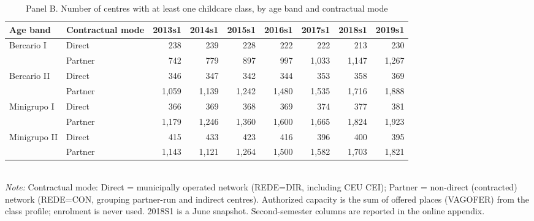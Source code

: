 \begin{table}[htbp]\centering
\caption{Panel B. Number of centres with at least one childcare class, by age band and contractual mode}
\label{tab:T2b_nescolas}
\small
\setlength{\tabcolsep}{4pt}
\begin{tabular}{llrrrrrrr}
\toprule
Age band & Contractual mode & 2013s1 & 2014s1 & 2015s1 & 2016s1 & 2017s1 & 2018s1 & 2019s1 \\
\midrule
Bercario I & Direct & 238 & 239 & 228 & 222 & 222 & 213 & 230 \\
 & Partner & 742 & 779 & 897 & 997 & 1,033 & 1,147 & 1,267 \\
Bercario II & Direct & 346 & 347 & 342 & 344 & 353 & 358 & 369 \\
 & Partner & 1,059 & 1,139 & 1,242 & 1,480 & 1,535 & 1,716 & 1,888 \\
Minigrupo I & Direct & 366 & 369 & 368 & 369 & 374 & 377 & 381 \\
 & Partner & 1,179 & 1,246 & 1,360 & 1,600 & 1,665 & 1,824 & 1,923 \\
Minigrupo II & Direct & 415 & 433 & 423 & 416 & 396 & 400 & 395 \\
 & Partner & 1,143 & 1,121 & 1,264 & 1,500 & 1,582 & 1,703 & 1,821 \\
\bottomrule
\end{tabular}
\\[3pt]{\footnotesize \textit{Note:} Contractual mode: Direct = municipally operated network (REDE=DIR, including CEU CEI); Partner = non-direct (contracted) network (REDE=CON, grouping partner-run and indirect centres). Authorized capacity is the sum of offered places (VAGOFER) from the class profile; enrolment is never used. 2018S1 is a June snapshot. Second-semester columns are reported in the online appendix.}
\end{table}
